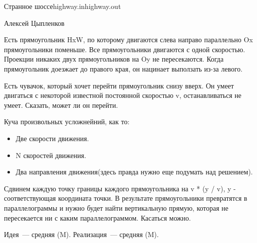 \begin{proposal}{Странное шоссе}{highway.in}{highway.out}{}

\Author                  
Алексей Цыпленков

\ProblemIdea
Есть прямоугольник HxW, по которому двигаются слева направо параллельно Ox
прямоугольники поменьше. Все прямоугольники двигаются с одной скоростью. Проекции
никаких двух прямоугольников на Oy не пересекаются. Когда прямоугольник доезжает до
правого края, он нацинает выползать из-за левого.

Есть чувачок, который хочет перейти прямоугольник снизу вверх. Он умеет двигаться
с некоторой известной постоянной скоростью v, останавливаться не умеет. Сказать,
может ли он перейти.
                    
\ProblemVariations
Куча произвольных усложнейний, как то:
\begin{itemize}
\item Две скорости движения.
\item N скоростей движения.
\item Два направления движения(здесь правда нужно еще подумать над решением).
\end{itemize}

\SolutionIdea
Сдвинем каждую точку границы каждого прямоугольника на v * (y / v), y - соответствующая 
координата точки. В результате прямоугольники превратятся в параллелограммы и нужно
будет найти вертикальную прямую, которая не пересекается ни с каким параллелограммом.
Касаться можно.

\ProblemComplexity
Идея~--- средняя (M). Реализация~--- средняя (M).

\end{proposal}
